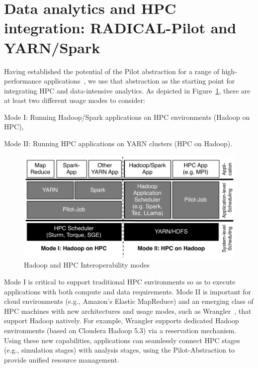 \section{Data analytics and HPC integration: RADICAL-Pilot and YARN/Spark}
\label{sec:integration_mode}

Having established the potential of the Pilot abstraction for a range of
high-performance
applications~\cite{treikalis2016repex,ragothaman2014developing,ko2014numerical},
we use that abstraction as the starting point for integrating HPC and
data-intensive analytics. As depicted in
Figure~\ref{fig:figures_hadoop-on-hpc-viceverse}, there are at least two
different usage modes to consider:
\begin{inparaenum}[1)]
    \item Mode I: Running Hadoop/Spark applications on HPC environments (Hadoop
    on HPC),
    \item Mode II: Running HPC applications on YARN clusters (HPC on Hadoop).
\end{inparaenum}

\begin{figure}[t]
    \centering
    \includegraphics[width=.85\textwidth]{figures/data_analytics_hpc/hpc_hadoop/hadoop-on-hpc-viceverse.pdf}
    \caption{Hadoop and HPC Interoperability
    modes\label{fig:figures_hadoop-on-hpc-viceverse}}
\end{figure}

Mode I is critical to support traditional HPC environments so as to execute
applications with both compute and data requirements. Mode II is important for
cloud environments (e.g., Amazon's Elastic MapReduce) and an emerging class of
HPC machines with new architectures and usage modes, such as
Wrangler~\cite{wrangler}, that support Hadoop natively. For example, Wrangler
supports dedicated Hadoop environments (based on Cloudera Hadoop 5.3) via a
reservation mechanism.
Using these new capabilities, applications can seamlessly connect HPC stages
(e.g., simulation stages) with analysis stages, using the Pilot-Abstraction to
provide unified resource management.


